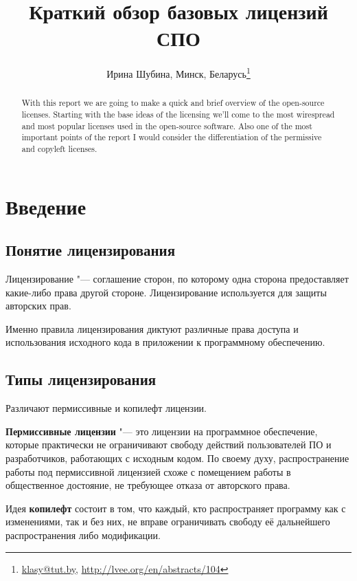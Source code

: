 \documentclass[10pt, a5paper]{article}
\begin{document}
\title{Краткий обзор базовых лицензий СПО}
\author{Ирина Шубина, Минск, Беларусь\footnote{\url{klasy@tut.by}, \url{http://lvee.org/en/abstracts/104}}}
\maketitle
\begin{abstract}
With this report we are going to make a quick and brief overview of the open-source licenses. Starting with the base ideas of the licensing we'll come to the most wirespread and most popular licenses used in the open-source software. Also one of the most important points of the report I would consider the differentiation of the permissive and copyleft licenses.
\end{abstract}
\section*{Введение}

\subsection*{Понятие лицензирования}

Лицензирование "--- соглашение сторон, по которому одна сторона предоставляет какие-либо права другой стороне. Лицензирование используется для защиты авторских прав.

Именно правила лицензирования диктуют различные права доступа и использования исходного кода в приложении к программному обеспечению.

\subsection*{Типы лицензирования}

Различают пермиссивные и копилефт лицензии.

\textbf{Пермиссивные лицензии} "--- это лицензии на программное \linebreak обеспечение, которые практически не ограничивают свободу действий пользователей ПО и разработчиков, работающих с исходным кодом. По своему духу, распространение работы под пермиссивной лицензией схоже с помещением работы в общественное достояние, не требующее отказа от авторского права.

Идея \textbf{копилефт} состоит в том, что каждый, кто распространяет программу как с изменениями, так и без них, не вправе ограничивать свободу её дальнейшего распространения либо модификации.
\end{document}
